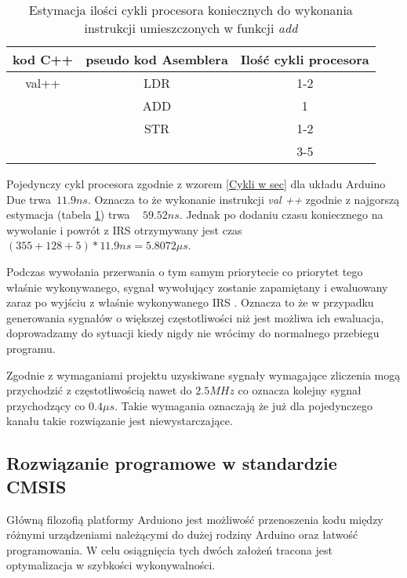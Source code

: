 \begin{table}[b]
        \begin{center}
        \caption{Estymacja ilości cykli procesora koniecznych do wykonania instrukcji umieszczonych w funkcji \textit{add} }
        \label{decompile add}
        \begin{tabular}{c|c|c}
                kod C++ & pseudo kod Asemblera & Ilość cykli procesora \cite{cycles} \\ \hline
                val++ & LDR & 1-2 \\
                        & ADD & 1 \\
                        & STR & 1-2 \\ 
                        \hline \hline
                        &   &  3-5 
        \end{tabular}
        \end{center}
\end{table}

Pojedynczy cykl procesora zgodnie z wzorem \ref{Cykli w sec} dla układu Arduino Due trwa~$ 11.9 ns $. 
Oznacza to że wykonanie instrukcji \textit{val ++} zgodnie z najgorszą estymacja (tabela \ref{decompile add}) trwa ~ $59.52 ns$. 
Jednak po dodaniu czasu koniecznego na wywołanie i powrót z IRS otrzymywany jest czas $ (355 + 128 + 5) * 11.9 ns =  5.8072 \mu s $. 

Podczas wywołania przerwania o tym samym priorytecie co priorytet tego właśnie wykonywanego, sygnał wywołujący zostanie zapamiętany i ewaluowany zaraz po wyjściu z właśnie wykonywanego IRS  \cite{datasheet}. 
Oznacza to że w przypadku generowania sygnałów o większej częstotliwości niż jest możliwa ich ewaluacja, doprowadzamy do sytuacji kiedy nigdy nie wrócimy do normalnego przebiegu programu. 

Zgodnie z wymaganiami projektu uzyskiwane sygnały wymagające zliczenia mogą przychodzić z częstotliwością nawet do $2.5MHz$ co oznacza kolejny sygnał przychodzący co $0.4\mu s$.
Takie wymagania oznaczają że już dla pojedynczego kanału takie rozwiązanie jest niewystarczające. 

\subsection{Rozwiązanie programowe w standardzie CMSIS}
\label{dzial CMSIS}
Główną filozofią platformy Arduiono jest możliwość przenoszenia kodu między różnymi urządzeniami należącymi do dużej rodziny Arduino oraz łatwość programowania.
W celu osiągnięcia tych dwóch założeń tracona jest optymalizacja w szybkości wykonywalności. 


